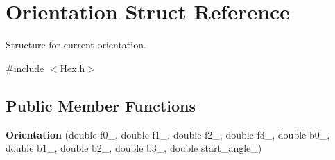 \hypertarget{structOrientation}{}\section{Orientation Struct Reference}
\label{structOrientation}


Structure for current orientation.  




{\ttfamily \#include $<$Hex.\+h$>$}

\subsection*{Public Member Functions}
\begin{DoxyCompactItemize}
\item 
{\bfseries Orientation} (double f0\+\_\+, double f1\+\_\+, double f2\+\_\+, double f3\+\_\+, double b0\+\_\+, double b1\+\_\+, double b2\+\_\+, double b3\+\_\+, double start\+\_\+angle\+\_\+)\hypertarget{structOrientation_a0d974a83aa515f282603dc32ab084ad5}{}\label{structOrientation_a0d974a83aa515f282603dc32ab084ad5}

\end{DoxyCompactItemize}
